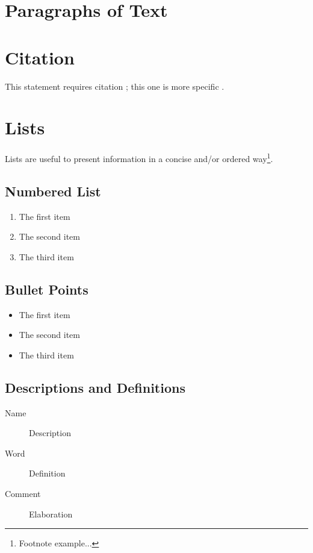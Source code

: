 \section{Paragraphs of Text}

\lipsum[1-7] %


\section{Citation}

This statement requires citation \cite{article_key}; this one is more specific \cite[162]{book_key}.



\section{Lists}

Lists are useful to present information in a concise and/or ordered way\footnote{Footnote example...}.

\subsection{Numbered List}

\begin{enumerate}
\item The first item
\item The second item
\item The third item
\end{enumerate}

\subsection{Bullet Points}

\begin{itemize}
\item The first item
\item The second item
\item The third item
\end{itemize}

\subsection{Descriptions and Definitions}

\begin{description}
\item[Name] Description
\item[Word] Definition
\item[Comment] Elaboration
\end{description}
